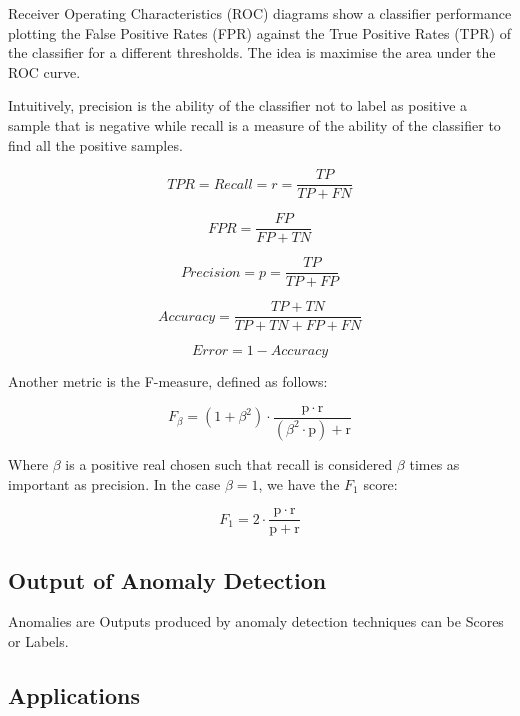 Receiver Operating Characteristics (ROC) diagrams show a classifier performance plotting the False Positive Rates (FPR) against the True Positive Rates (TPR) of the classifier for a different thresholds. The idea is maximise the area under the ROC curve.

Intuitively, precision is the ability of the classifier not to label as positive a sample that is negative while recall is a measure of the ability of the classifier to find all the positive samples. \cite{scikit-learn}


\begin{equation}
	TPR = Recall = r = \frac{TP}{TP+FN}
\end{equation}

\begin{equation}
	FPR = \frac{FP}{FP+TN}
\end{equation}

\begin{equation}
	Precision = p = \frac{TP}{TP+FP}
\end{equation}

\begin{equation}
	Accuracy = \frac{TP+TN}{TP+TN+FP+FN}
\end{equation}

\begin{equation}
	Error = 1 - Accuracy
\end{equation}

Another metric is the F-measure, defined as follows:

\begin{equation}
	F_\beta = (1 + \beta^2) \cdot \frac{\mathrm{p} \cdot \mathrm{r}}{(\beta^2 \cdot \mathrm{p}) + \mathrm{r}}
\end{equation}

Where $\beta$ is a positive real chosen such that recall is considered $\beta$ times as important as precision. In the case $\beta = 1$, we have the $F_1$ score:

\begin{equation}
	F_1 = 2 \cdot \frac{\mathrm{p} \cdot \mathrm{r}}{\mathrm{p} + \mathrm{r}}
\end{equation}



\subsection{Output of Anomaly Detection}

Anomalies are Outputs produced by anomaly detection techniques can be Scores or Labels.


\subsection{Applications}


